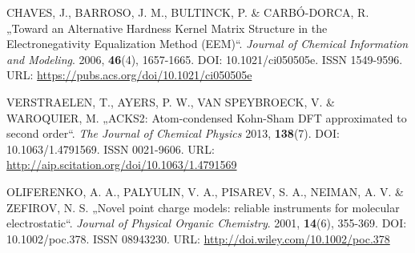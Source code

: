 \begin{thebibliography}{10}
CHAVES, J., BARROSO, J. M., BULTINCK, P. \& CARBÓ-DORCA, R. „Toward an Alternative Hardness Kernel Matrix Structure in the Electronegativity Equalization Method (EEM)“. \textit{Journal of Chemical Information and Modeling}. 2006, \textbf{46}(4), 1657-1665. DOI: 10.1021/ci050505e. ISSN 1549-9596. URL: \url{https://pubs.acs.org/doi/10.1021/ci050505e}

VERSTRAELEN, T., AYERS, P. W., VAN SPEYBROECK, V. \& WAROQUIER, M. „ACKS2: Atom-condensed Kohn-Sham DFT approximated to second order“. \textit{The Journal of Chemical Physics} 2013, \textbf{138}(7). DOI: 10.1063/1.4791569. ISSN 0021-9606. URL: \url{http://aip.scitation.org/doi/10.1063/1.4791569}

OLIFERENKO, A. A., PALYULIN, V. A., PISAREV, S. A., NEIMAN, A. V. \& ZEFIROV, N. S. „Novel point charge models: reliable instruments for molecular electrostatic“. \textit{Journal of Physical Organic Chemistry}. 2001, \textbf{14}(6), 355-369. DOI: 10.1002/poc.378. ISSN 08943230. URL: \url{ http://doi.wiley.com/10.1002/poc.378}


\end{thebibliography}


\cleardoublepage
